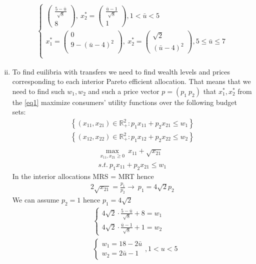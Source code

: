 \documentclass[a4paper]{article}
\begin{document}
\begin{enumerate}[(i)]
\begin{align}
\begin{cases}
	\begin{pmatrix}
	\frac{5 - \bar{u}}{\sqrt{8}}\\
	8
	\end{pmatrix},\ x^*_2 = \begin{pmatrix}
	 \frac{\bar{u}- 1}{\sqrt{8}}\\
	 1
	\end{pmatrix}, 1 < \bar{u} < 5\\
	x^*_1 = 
	\begin{pmatrix}
	0\\
	9 - (\bar{u} - 4)^2\\
	\end{pmatrix},\ x^*_2 = \begin{pmatrix}
	\sqrt{2}\\
	(\bar{u} - 4)^2
	\end{pmatrix}, 5 \le \bar{u} \le 7\\
	\end{cases}
	\end{align}
	\item To find euilibria with transfers we need to find wealth levels and prices corresponding to each interior Pareto efficient allocation. That means that we need to find such $w_1, w_2$ and such a price vector $p = (p_1\ p_2)$ that $x^*_1, x^*_2$ from the \eqref{eq1} maximize consumers' utility functions over the following budget sets:
	\begin{align*}
	\left\{(x_{11}, x_{21}) \in \mathbb{R}^2_{+}: p_1x_{11} + p_2x_{21} \le w_1\right\}\\	\left\{(x_{12}, x_{22}) \in \mathbb{R}^2_{+}: p_1x_{12} + p_2x_{22} \le w_2\right\}\\
	\end{align*}
	\begin{align*}
	\underset{x_{11}, x_{21} \ge 0}{\max}\ x_{11} + \sqrt{x_{21}}\\
	 s.t.\ p_1x_{11} + p_2x_{21} \le w_1
	\end{align*}
	In the interior allocations MRS = MRT hence
	\begin{align*}
	2\sqrt{x_{21}} = \frac{p_1}{p_2} \to\ p_1 = 4\sqrt{2}p_2
	\end{align*}
	We can assume $p_2 = 1$ hence $p_1 = 4\sqrt{2}$
	\begin{align*}
	&\begin{cases}
	4\sqrt{2} \cdot \frac{5 - \bar{u}}{\sqrt{8}} + 8 = w_1\\
	4\sqrt{2} \cdot \frac{\bar{u} - 1}{\sqrt{8}} + 1 = w_2
	\end{cases}\\
	&\begin{cases}
	w_1 = 18 - 2\bar{u}\\
	w_2 = 2\bar{u} - 1
	\end{cases}, 1 < u < 5
	\end{align*}
\end{enumerate}
\end{document}
